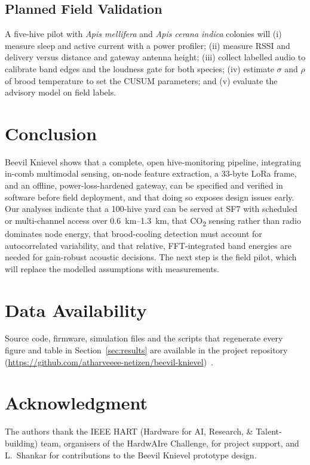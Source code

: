 \documentclass[conference]{IEEEtran}
\newcommand{\COtwo}{CO\textsubscript{2}}
\begin{document}
\subsection{Planned Field Validation}
A five-hive pilot with \textit{Apis mellifera} and \textit{Apis cerana indica} colonies will (i) measure sleep and active current with a power profiler; (ii) measure RSSI and delivery versus distance and gateway antenna height; (iii) collect labelled audio to calibrate band edges and the loudness gate for both species; (iv) estimate $\sigma$ and $\rho$ of brood temperature to set the CUSUM parameters; and (v) evaluate the advisory model on field labels.

\section{Conclusion}\label{sec:concl}
Beevil Knievel shows that a complete, open hive-monitoring pipeline, integrating in-comb multimodal sensing, on-node feature extraction, a 33-byte LoRa frame, and an offline, power-loss-hardened gateway, can be specified and verified in software before field deployment, and that doing so exposes design issues early. Our analyses indicate that a 100-hive yard can be served at SF7 with scheduled or multi-channel access over \SIrange{0.6}{1.3}{km}, that \COtwo{} sensing rather than radio dominates node energy, that brood-cooling detection must account for autocorrelated variability, and that relative, FFT-integrated band energies are needed for gain-robust acoustic decisions. The next step is the field pilot, which will replace the modelled assumptions with measurements.

\section*{Data Availability}
Source code, firmware, simulation files and the scripts that regenerate every figure and table in Section~\ref{sec:results} are available in the project repository (\url{https://github.com/atharveeee-netizen/beevil-knievel})~\cite{beevilrepo}.

\section*{Acknowledgment}
The authors thank the IEEE HART (Hardware for AI, Research, \& Talent-building) team, organisers of the HardwAIre Challenge, for project support, and L.~Shankar for contributions to the Beevil Knievel prototype design.



\end{document}

